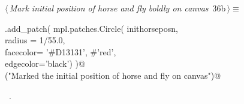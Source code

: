 \documentclass[11.5pt]{report}
\begin{document}
\begin{flushleft}
\begin{list}{}{\setlength{\itemsep}{-\parsep}\setlength{\itemindent}{-\leftmargin}}
\item{}
\end{list}
\vspace{4ex}
\end{flushleft}

\vspace{-0.8cm}\newchunk 

\begin{flushleft} \small\label{scrap45}\raggedright\small
{} $\langle\,${\itshape Mark initial position of horse and fly boldly on canvas}\nobreak\ {\footnotesize {36b}}$\,\rangle\equiv$
\vspace{-1ex}
\begin{list}{}{} \item
\mbox{}\verb@ax.add_patch( mpl.patches.Circle( inithorseposn, \@\\
\mbox{}\verb@                                  radius = 1/55.0,\@\\
\mbox{}\verb@                                  facecolor= '#D13131', #'red',\@\\
\mbox{}\verb@                                  edgecolor='black')  )@\\
\mbox{}\verb@debug("Marked the initial position of horse and fly on canvas")@\\
\mbox{}\verb@@{\NWsep}
\end{list}
\vspace{-1.5ex}
\footnotesize
\begin{list}{}{\setlength{\itemsep}{-\parsep}\setlength{\itemindent}{-\leftmargin}}
\item \NWtxtMacroRefIn\ .

\item{}
\end{list}
\vspace{4ex}
\end{flushleft}
\end{document}
